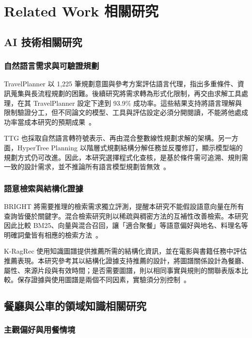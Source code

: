 \chapter{Related Work 相關研究}

\section{AI 技術相關研究}

\subsection{自然語言需求與可驗證規劃}

TravelPlanner 以 1,225 筆規劃意圖與參考方案評估語言代理，指出多重條件、資訊蒐集與長流程規劃的困難。後續研究將需求轉為形式化限制，再交由求解工具處理，在其 TravelPlanner 設定下達到 93.9\% 成功率。這些結果支持將語言理解與限制驗證分工，但不同論文的模型、工具與評估設定必須分開閱讀，不能將他處成功率當成本研究的預期成果~\cite{llm_planning,llm_planning_tools}。

TTG 也採取自然語言轉符號表示、再由混合整數線性規劃求解的架構。另一方面，HyperTree Planning 以階層式規劃結構分解任務並反覆修訂，顯示模型端的規劃方式仍可改進。因此，本研究選擇程式化查核，是基於條件需可追溯、規則需一致的設計需求，並不推論所有語言模型規劃皆無效~\cite{ttg,hypertree_planning}。

\subsection{語意檢索與結構化證據}

BRIGHT 將需要推理的檢索需求獨立評測，提醒本研究不能假設語意向量在所有查詢皆優於關鍵字。混合檢索研究則以稀疏與稠密方法的互補性改善檢索。本研究因此比較 BM25、向量與混合召回，讓「適合聚餐」等語意偏好與地名、料理名等明確詞彙皆有相應的檢索方法~\cite{bright,hybrid_retrieval}。

K-RagRec 使用知識圖譜提供推薦所需的結構化資訊，並在電影與書籍任務中評估推薦表現。本研究參考其以結構化證據支持推薦的設計，將圖譜關係設計為餐廳、屬性、來源片段與有效時間；是否需要圖譜，則以相同事實與規則的關聯表版本比較。保存證據與使用圖譜是兩個不同因素，實驗須分別控制~\cite{knowledge_graph_llm_recommendation}。

\section{餐廳與公車的領域知識相關研究}

\subsection{主觀偏好與用餐情境}


